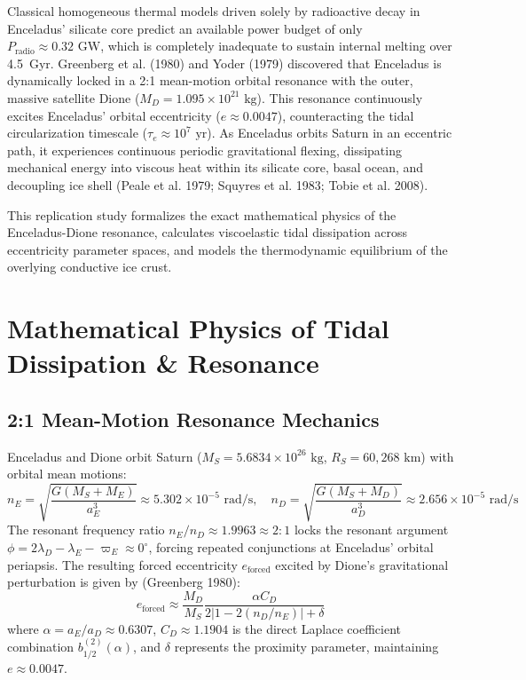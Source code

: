 \documentclass[11pt,a4paper]{article}
\begin{document}
Classical homogeneous thermal models driven solely by radioactive decay in Enceladus' silicate core predict an available power budget of only $P_{\text{radio}} \approx 0.32\text{ GW}$, which is completely inadequate to sustain internal melting over 4.5~Gyr. Greenberg et al. (1980) and Yoder (1979) discovered that Enceladus is dynamically locked in a 2:1 mean-motion orbital resonance with the outer, massive satellite Dione ($M_D = 1.095 \times 10^{21}\text{ kg}$). This resonance continuously excites Enceladus' orbital eccentricity ($e \approx 0.0047$), counteracting the tidal circularization timescale ($\tau_e \approx 10^7\text{ yr}$). As Enceladus orbits Saturn in an eccentric path, it experiences continuous periodic gravitational flexing, dissipating mechanical energy into viscous heat within its silicate core, basal ocean, and decoupling ice shell (Peale et al. 1979; Squyres et al. 1983; Tobie et al. 2008).

This replication study formalizes the exact mathematical physics of the Enceladus-Dione resonance, calculates viscoelastic tidal dissipation across eccentricity parameter spaces, and models the thermodynamic equilibrium of the overlying conductive ice crust.

\section{Mathematical Physics of Tidal Dissipation \& Resonance}

\subsection{2:1 Mean-Motion Resonance Mechanics}
Enceladus and Dione orbit Saturn ($M_S = 5.6834 \times 10^{26}\text{ kg}$, $R_S = 60,268\text{ km}$) with orbital mean motions:
\begin{equation}
n_E = \sqrt{\frac{G(M_S + M_E)}{a_E^3}} \approx 5.302 \times 10^{-5}\text{ rad/s}, \quad
n_D = \sqrt{\frac{G(M_S + M_D)}{a_D^3}} \approx 2.656 \times 10^{-5}\text{ rad/s}
\end{equation}
The resonant frequency ratio $n_E / n_D \approx 1.9963 \approx 2:1$ locks the resonant argument $\phi = 2\lambda_D - \lambda_E - \varpi_E \approx 0^\circ$, forcing repeated conjunctions at Enceladus' orbital periapsis. The resulting forced eccentricity $e_{\text{forced}}$ excited by Dione's gravitational perturbation is given by (Greenberg 1980):
\begin{equation}
e_{\text{forced}} \approx \frac{M_D}{M_S} \frac{\alpha C_D}{2 |1 - 2(n_D/n_E)| + \delta}
\end{equation}
where $\alpha = a_E / a_D \approx 0.6307$, $C_D \approx 1.1904$ is the direct Laplace coefficient combination $b_{1/2}^{(2)}(\alpha)$, and $\delta$ represents the proximity parameter, maintaining $e \approx 0.0047$.
\end{document}
